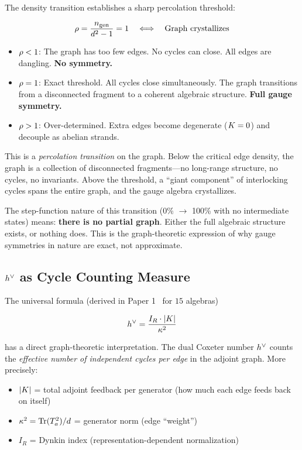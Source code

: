 The density transition establishes a sharp percolation threshold:

\begin{equation}
\rho = \frac{n_{\mathrm{gen}}}{d^2 - 1} = 1 \quad \Longleftrightarrow \quad \text{Graph crystallizes}
\end{equation}

\begin{itemize}
    \item $\rho < 1$: The graph has too few edges. No cycles can close. All edges are dangling. \textbf{No symmetry.}
    \item $\rho = 1$: Exact threshold. All cycles close simultaneously. The graph transitions from a disconnected fragment to a coherent algebraic structure. \textbf{Full gauge symmetry.}
    \item $\rho > 1$: Over-determined. Extra edges become degenerate ($K = 0$) and decouple as abelian strands.
\end{itemize}

This is a \emph{percolation transition} on the graph. Below the critical edge density, the graph is a collection of disconnected fragments---no long-range structure, no cycles, no invariants. Above the threshold, a ``giant component'' of interlocking cycles spans the entire graph, and the gauge algebra crystallizes.

The step-function nature of this transition (0\% $\to$ 100\% with no intermediate states) means: \textbf{there is no partial graph}. Either the full algebraic structure exists, or nothing does. This is the graph-theoretic expression of why gauge symmetries in nature are exact, not approximate.

\subsection{$h^\vee$ as Cycle Counting Measure}\label{sec:dual_coxeter_cycle}

The universal formula (derived in Paper 1~\cite{paper1_killing_algebra} for $15$ algebras)

\begin{equation}
h^\vee = \frac{I_R \cdot |K|}{\kappa^2}
\end{equation}

has a direct graph-theoretic interpretation. The dual Coxeter number $h^\vee$ counts the \emph{effective number of independent cycles per edge} in the adjoint graph. More precisely:

\begin{itemize}
    \item $|K|$ = total adjoint feedback per generator (how much each edge feeds back on itself)
    \item $\kappa^2 = \mathrm{Tr}(T_a^2)/d$ = generator norm (edge ``weight'')
    \item $I_R$ = Dynkin index (representation-dependent normalization)
\end{itemize}

